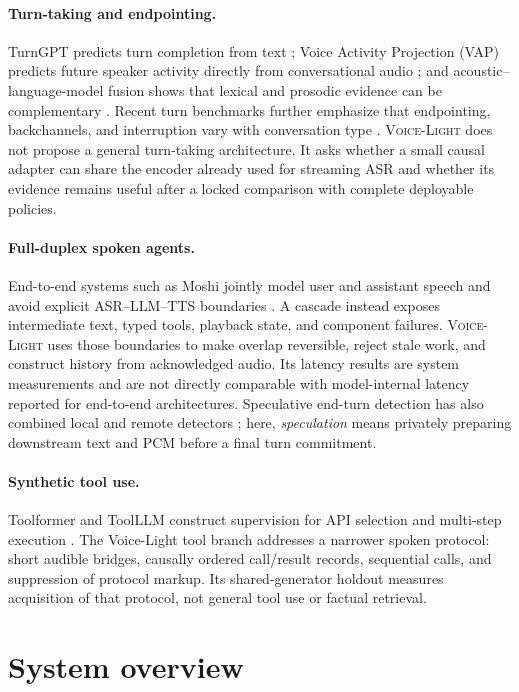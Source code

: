\documentclass[10pt,twocolumn]{article}
\newcommand{\VoiceLight}{\textsc{Voice-Light}}
\begin{document}
\paragraph{Turn-taking and endpointing.}
TurnGPT predicts turn completion from text \cite{turngpt}; Voice Activity Projection (VAP) predicts
future speaker activity directly from conversational audio \cite{vap}; and acoustic--language-model
fusion shows that lexical and prosodic evidence can be complementary \cite{acousticllm}. Recent
turn benchmarks further emphasize that endpointing, backchannels, and interruption vary with
conversation type \cite{turnbench,fullduplexbench}. \VoiceLight{} does not propose a general
turn-taking architecture. It asks whether a small causal adapter can share the encoder already used
for streaming ASR and whether its evidence remains useful after a locked comparison with complete
deployable policies.

\paragraph{Full-duplex spoken agents.}
End-to-end systems such as Moshi jointly model user and assistant speech and avoid explicit
ASR--LLM--TTS boundaries \cite{moshi}. A cascade instead exposes intermediate text, typed tools,
playback state, and component failures. \VoiceLight{} uses those boundaries to make overlap
reversible, reject stale work, and construct history from acknowledged audio. Its latency results
are system measurements and are not directly comparable with model-internal latency reported for
end-to-end architectures. Speculative end-turn detection has also combined local and remote
detectors \cite{speculativeetd}; here, \emph{speculation} means privately preparing downstream text
and PCM before a final turn commitment.

\paragraph{Synthetic tool use.}
Toolformer and ToolLLM construct supervision for API selection and multi-step execution
\cite{toolformer,toollm}. The Voice-Light tool branch addresses a narrower spoken protocol: short
audible bridges, causally ordered call/result records, sequential calls, and suppression of
protocol markup. Its shared-generator holdout measures acquisition of that protocol, not general
tool use or factual retrieval.

\section{System overview}
\end{document}
